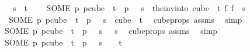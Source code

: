 \begin{isabellebody}
\ \ \ {\isachardoublequoteopen}s\ {\isacharless}{\kern0pt}\ t{\isachardoublequoteclose}\ \isanewline
\ \ \ {\isachardoublequoteopen}{\isacharparenleft}{\kern0pt}SOME\ p{\isachardot}{\kern0pt}\ p{\isasymin}cube\ {}\ {\isacharparenleft}{\kern0pt}t{\isacharplus}{\kern0pt}{}{\isacharparenright}{\kern0pt}\ {\isasymand}\ p\ {}\ {\isacharequal}{\kern0pt}\ s{\isacharparenright}{\kern0pt}\ {\isacharequal}{\kern0pt}\ {\isacharparenleft}{\kern0pt}the{\isacharunderscore}{\kern0pt}inv{\isacharunderscore}{\kern0pt}into\ {\isacharparenleft}{\kern0pt}cube\ {}\ t{\isacharparenright}{\kern0pt}\ {\isacharparenleft}{\kern0pt}{\isasymlambda}f{\isachardot}{\kern0pt}\ f\ {}{\isacharparenright}{\kern0pt}\ s{\isacharparenright}{\kern0pt}{\isachardoublequoteclose}\isanewline
%
\isadelimproof
%
\endisadelimproof
%
\isatagproof
{}\isamarkupfalse%
{\isacharminus}{\kern0pt}\isanewline
\ \ \isamarkupfalse%
\ {\isacharasterisk}{\kern0pt}{\isacharcolon}{\kern0pt}\ {\isachardoublequoteopen}{\isacharparenleft}{\kern0pt}SOME\ p{\isachardot}{\kern0pt}\ p{\isasymin}cube\ {}\ {\isacharparenleft}{\kern0pt}t{\isacharplus}{\kern0pt}{}{\isacharparenright}{\kern0pt}\ {\isasymand}\ p\ {}\ {\isacharequal}{\kern0pt}\ s{\isacharparenright}{\kern0pt}\ {\isasymin}\ cube\ {}\ {\isacharparenleft}{\kern0pt}t{\isacharplus}{\kern0pt}{}{\isacharparenright}{\kern0pt}{\isachardoublequoteclose}\ \isamarkupfalse%
\ cube{\isacharunderscore}{\kern0pt}props\ assms\ \isamarkupfalse%
\ simp\isanewline
\ \ \isamarkupfalse%
\ \isamarkupfalse%
\ {\isachardoublequoteopen}{\isacharparenleft}{\kern0pt}SOME\ p{\isachardot}{\kern0pt}\ p{\isasymin}cube\ {}\ {\isacharparenleft}{\kern0pt}t{\isacharplus}{\kern0pt}{}{\isacharparenright}{\kern0pt}\ {\isasymand}\ p\ {}\ {\isacharequal}{\kern0pt}\ s{\isacharparenright}{\kern0pt}\ {}\ {\isacharequal}{\kern0pt}\ s{\isachardoublequoteclose}\ \isamarkupfalse%
\ cube{\isacharunderscore}{\kern0pt}props\ assms\ \isamarkupfalse%
\ simp\isanewline
\ \ \isamarkupfalse%
\isanewline
\ \ \isacommand{{\isacharbraceleft}{\kern0pt}}\isamarkupfalse%
\isanewline
\ \ \ \ \isamarkupfalse%
\ {\isachardoublequoteopen}{\isacharparenleft}{\kern0pt}SOME\ p{\isachardot}{\kern0pt}\ p{\isasymin}cube\ {}\ {\isacharparenleft}{\kern0pt}t{\isacharplus}{\kern0pt}{}{\isacharparenright}{\kern0pt}\ {\isasymand}\ p\ {}\ {\isacharequal}{\kern0pt}\ s{\isacharparenright}{\kern0pt}\ {\isacharbackquote}{\kern0pt}\ {\isacharbraceleft}{\kern0pt}{\isachardot}{\kern0pt}{\isachardot}{\kern0pt}{\isacharless}{\kern0pt}{}{\isacharbraceright}{\kern0pt}\ {\isasymsubseteq}\ {\isacharbraceleft}{\kern0pt}{\isachardot}{\kern0pt}{\isachardot}{\kern0pt}{\isacharless}{\kern0pt}t{\isacharbraceright}{\kern0pt}{\isachardoublequoteclose}\ \isamarkupfalse%

\end{isabellebody}
